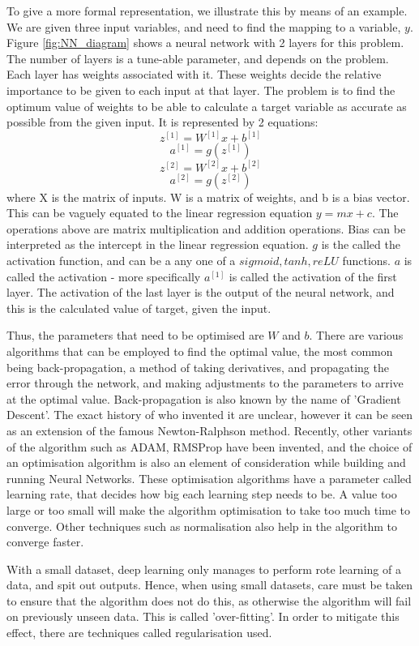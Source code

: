 To give a more formal representation, we illustrate this by means of an example. We are given three input variables, and need to find the mapping to a variable, \(y\). Figure \ref{fig:NN_diagram} shows a neural network with 2 layers for this problem.  The number of layers is a tune-able parameter, and depends on the problem. Each layer has weights associated with it. These weights decide the relative importance to be given to each input at that layer. The problem is to find the optimum value of weights to be able to calculate a target variable as accurate as possible from the given input. It is represented by 2 equations:
\[z^{[1]}=W^{[1]}x+b^{[1]}\]
\[a^{[1]}=g(z^{[1]})\]
\[z^{[2]}=W^{[2]}x+b^{[2]}\]
\[a^{[2]}=g(z^{[2]})\]
where X is the matrix of inputs. W is a matrix of weights, and b is a bias vector. This can be vaguely equated to the linear regression equation \(y=mx + c\). The operations above are matrix multiplication and addition operations. Bias can be interpreted as the intercept in the linear regression equation. \(g\) is the called the activation function, and can be a any one of a \(sigmoid, tanh, reLU\) functions. \(a\) is called the activation - more specifically \(a^{[1]}\) is called the activation of the first layer. The activation of the last layer is the output of the neural network, and this is the calculated value of target, given the input. 

Thus, the parameters that need to be optimised are \(W\) and \(b\). There are various algorithms that can be employed to find the optimal value, the most common being back-propagation, a method of taking derivatives, and propagating the error through the network, and making adjustments to the parameters to arrive at the optimal value. Back-propagation is also known by the name of 'Gradient Descent'. The exact history of who invented it are unclear, however it can be seen as an extension of the famous Newton-Ralphson method. Recently, other variants of the algorithm such as ADAM\cite{kingma_adam:_2014}, RMSProp\cite{noauthor_neural_nodate-1} have been invented, and the choice of an optimisation algorithm is also an element of consideration while building and running Neural Networks. These optimisation algorithms have a parameter called learning rate, that decides how big each learning step needs to be. A value too large or too small will make the algorithm optimisation to take too much time to converge. Other techniques such as normalisation also help in the algorithm to converge faster. 


With a small dataset, deep learning only manages to perform rote learning of a data, and spit out outputs. Hence, when using small datasets, care must be taken to ensure that the algorithm does not do this, as otherwise the algorithm will fail on previously unseen data. This is called 'over-fitting'. In order to mitigate this effect, there are techniques called regularisation used.

